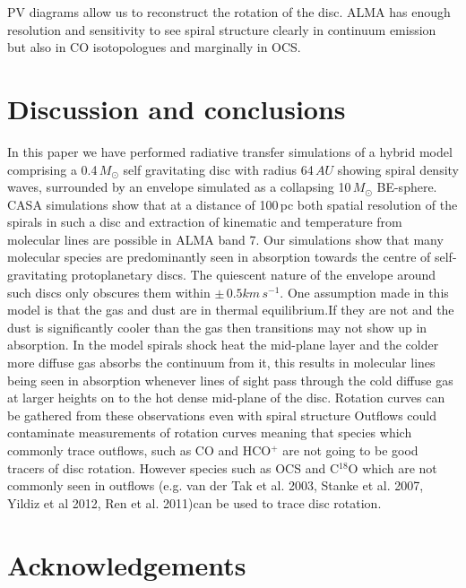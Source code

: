 \documentclass[useAMS,usenatbib]{mn2e}
\begin{document}
PV diagrams allow us to reconstruct the rotation of the disc. ALMA has enough resolution and sensitivity to see spiral structure clearly in continuum emission but also in CO isotopologues and marginally in OCS.


\section{Discussion and conclusions} \label{sec:discussion}

In this paper we have performed radiative transfer simulations of a hybrid model comprising a 0.4$\, M_\odot$ self gravitating disc with radius 64$\,AU$ showing spiral density waves, surrounded by an envelope simulated as a collapsing 10$\,M_\odot$ BE-sphere. CASA simulations show that at a distance of 100$\,$pc both spatial resolution of the spirals in such a disc and extraction of kinematic and temperature from molecular lines are possible in ALMA band 7. Our simulations show that many  molecular species are predominantly seen in absorption towards the centre of  self-gravitating protoplanetary discs. The quiescent nature of the envelope around such discs only obscures them within $\pm\,0.5 km\,s^{-1}$.\newline
One assumption made in this model is that the gas and dust are in thermal equilibrium.If they are not and the dust is significantly cooler than the gas then transitions may not show up in absorption.\newline
In the model spirals shock heat the mid-plane layer and the colder more diffuse gas absorbs the continuum from it, this results in molecular lines being seen in absorption whenever lines of sight pass through the cold diffuse gas at larger heights on to the hot dense mid-plane of the disc. Rotation curves can be gathered from these observations even with spiral structure\newline
Outflows could contaminate measurements of rotation curves meaning that species  which commonly trace outflows, such as CO and HCO$^+$ are not going to be good tracers of disc rotation. However species such as OCS and C$^{18}$O which are not commonly seen in outflows (e.g. van der Tak et al. 2003, Stanke et al. 2007, Yildiz et al 2012, Ren et al. 2011)can be used to trace disc rotation.


\section*{Acknowledgements}
\end{document}
